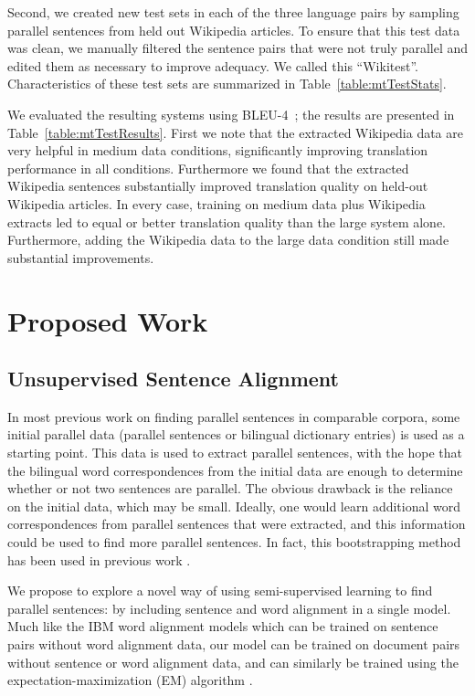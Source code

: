\documentclass[11pt,letterpaper]{article}
\begin{document}
Second, we created new test sets in each of the three language
pairs by sampling parallel sentences from held out Wikipedia
articles.  To ensure that this test data was clean, we manually
filtered the sentence pairs that were not truly parallel and
edited them as necessary to improve adequacy.  We called
this ``Wikitest''. Characteristics of
these test sets are summarized in Table~\ref{table:mtTestStats}.

We evaluated the resulting systems using
BLEU-4~\cite{Papineni02}; the results are presented in
Table~\ref{table:mtTestResults}.  First we note that the extracted
Wikipedia data are very helpful in medium data conditions,
significantly improving translation performance in all conditions.
Furthermore we found that the extracted Wikipedia sentences
substantially improved translation quality on held-out Wikipedia
articles. In every case, training on medium data plus Wikipedia
extracts led to equal or better translation quality than the large
system alone. Furthermore, adding the Wikipedia data to the large
data condition still made substantial improvements.

\section{Proposed Work}

\subsection{Unsupervised Sentence Alignment}
\label{sec:alignment}
In most previous work on finding parallel sentences in comparable corpora, some
initial parallel data (parallel sentences or bilingual dictionary entries) is
used as a starting point. This data is used to extract parallel sentences, with
the hope that the bilingual word correspondences from the initial data are enough to
determine whether or not two sentences are parallel. The obvious drawback is
the reliance on the initial data, which may be small. Ideally, one would learn
additional word correspondences from parallel sentences that were extracted, and
this information could be used to find more parallel sentences. In fact, this
bootstrapping method has been used in previous work \cite{Fung04a,Fung04b,Wu05}.

We propose to explore a novel way of using semi-supervised learning to find
parallel sentences: by including sentence and word alignment in a single model.
Much like the IBM word alignment models \cite{Brown93} which can be trained on
sentence pairs without word alignment data, our model can be trained on document
pairs without sentence or word alignment data, and can similarly be trained using
the expectation-maximization (EM) algorithm \cite{Dempster77}.
\end{document}
